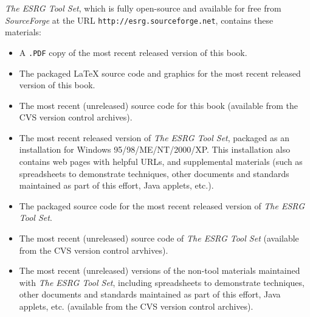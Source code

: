 \emph{The ESRG Tool Set}, which is fully open-source and 
available for free from \emph{SourceForge} at the URL
\texttt{http://esrg.sourceforge.net}, contains 
these materials: 

\begin{itemize} 
\item A \texttt{.PDF} copy of the most recent released
      version of this book.

\item The packaged \LaTeX{} source code and graphics
      for the most recent released
      version of this book.

\item The most recent (unreleased) source code for this book
      (available from the CVS version control archives).

\item The most recent released version of 
      \emph{The ESRG Tool Set}, packaged as an installation
      for Windows 95/98/ME/NT/2000/XP.  This installation also
	  contains web pages with helpful URLs, and supplemental
	  materials (such as spreadsheets to demonstrate techniques,
	  other documents and standards maintained as part of this
	  effort,
	  Java applets, etc.).

\item The packaged source code for the most recent released
      version of \emph{The ESRG Tool Set}.

\item The most recent (unreleased) source code of
      \emph{The ESRG Tool Set} (available from the CVS
      version control arvhives).

\item The most recent (unreleased) versions of the non-tool
      materials maintained with \emph{The ESRG Tool Set}, including
	  spreadsheets to demonstrate techniques, other
      documents and standards maintained as part of this
	  effort, Java applets, etc. (available from the CVS version control
	  archives).
\end{itemize} 


